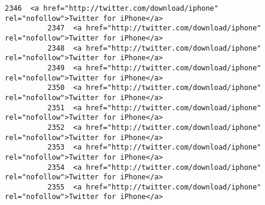 \documentclass[11pt]{article}
\begin{document}
\begin{Verbatim}[commandchars=\\\{\}]
          2346  <a href="http://twitter.com/download/iphone" rel="nofollow">Twitter for iPhone</a>   
          2347  <a href="http://twitter.com/download/iphone" rel="nofollow">Twitter for iPhone</a>   
          2348  <a href="http://twitter.com/download/iphone" rel="nofollow">Twitter for iPhone</a>   
          2349  <a href="http://twitter.com/download/iphone" rel="nofollow">Twitter for iPhone</a>   
          2350  <a href="http://twitter.com/download/iphone" rel="nofollow">Twitter for iPhone</a>   
          2351  <a href="http://twitter.com/download/iphone" rel="nofollow">Twitter for iPhone</a>   
          2352  <a href="http://twitter.com/download/iphone" rel="nofollow">Twitter for iPhone</a>   
          2353  <a href="http://twitter.com/download/iphone" rel="nofollow">Twitter for iPhone</a>   
          2354  <a href="http://twitter.com/download/iphone" rel="nofollow">Twitter for iPhone</a>   
          2355  <a href="http://twitter.com/download/iphone" rel="nofollow">Twitter for iPhone</a>   
          

\end{Verbatim}
\end{document}
